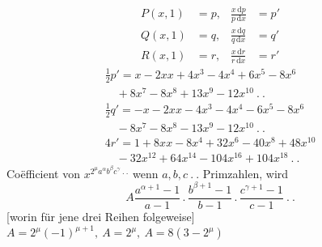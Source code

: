 \[
\begin{aligned}
P(x,1)&=p, & \frac{x\,\mathrm{d}p}{p\,\mathrm{d}x}&=p'\\[8pt]
Q(x,1)&=q, & \frac{x\,\mathrm{d}q}{q\,\mathrm{d}x}&=q'\\[8pt]
R(x,1)&=r, & \frac{x\,\mathrm{d}r}{r\,\mathrm{d}x}&=r'
\end{aligned}
\]
\[
\begin{gathered}
\tfrac12p'=x-2xx+4x^3-4x^4+6x^5-8x^6\\[8pt]\quad{}+8x^7-8x^8+13x^9-12x^{10}\ .\ .\\[8pt]
\tfrac12q'=-x-2xx-4x^3-4x^4-6x^5-8x^6\\[8pt]\quad{}-8x^7-8x^8-13x^9-12x^{10}\ .\ .\\[8pt]
4r'=1+8xx-8x^4+32x^6-40x^8+48x^{10}\\[8pt]\quad{}-32x^{12}+64x^{14}-104x^{16}+104x^{18}\ .\ .
\end{gathered}
\]
Coëfficient von $x^{2^\mu a^\alpha b^{\beta}c^\gamma\ .\ .}$ wenn $a,b,c\ .\ .$ Primzahlen, wird
\[
A\frac{a^{\alpha+1}-1}{a-1}\,.\,\frac{b^{\beta+1}-1}{b-1}\,.\,\frac{c^{\gamma+1}-1}{c-1}\ .\ .
\]
[worin für jene drei Reihen folgeweise]
$A=2^\mu(-1)^{\mu+1},\ A=2^\mu,\ A=8(3-2^\mu)$

